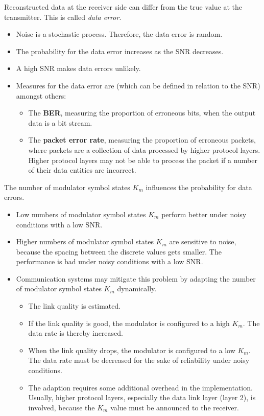 \begin{refsection}
\begin{fact}
	Reconstructed data at the receiver side can differ from the true value at the transmitter. This is called \emph{data error}.
\end{fact}

\begin{itemize}
	\item Noise is a stochastic process. Therefore, the data error is random.
	\item The probability for the data error increases as the \ac{SNR} decreases.
	\item A high \ac{SNR} makes data errors unlikely.
	\item Measures for the data error are (which can be defined in relation to the \ac{SNR}) amongst others:
	\begin{itemize}
		\item The  \textbf{\acf{BER}}, measuring the proportion of erroneous bits, when the output data is a bit stream.
		\item The  \textbf{packet error rate}, measuring the proportion of erroneous packets, where packets are a collection of data processed by higher protocol layers. Higher protocol layers may not be able to process the packet if a number of their data entities are incorrect.
	\end{itemize}
\end{itemize}

\begin{fact}
	The number of modulator symbol states $K_m$ influences the probability for data errors.
\end{fact}

\begin{itemize}
	\item Low numbers of modulator symbol states $K_m$ perform better under noisy conditions with a low \ac{SNR}.
	\item Higher numbers of modulator symbol states $K_m$ are sensitive to noise, because the spacing between the discrete values gets smaller. The performance is bad under noisy conditions with a low \ac{SNR}.
	\item Communication systems may mitigate this problem by adapting the number of modulator symbol states $K_m$ dynamically.
	\begin{itemize}
		\item The link quality is estimated.
		\item If the link quality is good, the modulator is configured to a high $K_m$. The data rate is thereby increased.
		\item When the link quality drops, the modulator is configured to a low $K_m$. The data rate must be decreased for the sake of reliability under noisy conditions.
		\item The adaption requires some additional overhead in the implementation. Usually, higher protocol layers, especially the data link layer (layer 2), is involved, because the $K_m$ value must be announced to the receiver.
	\end{itemize}
\end{itemize}


\end{refsection}
